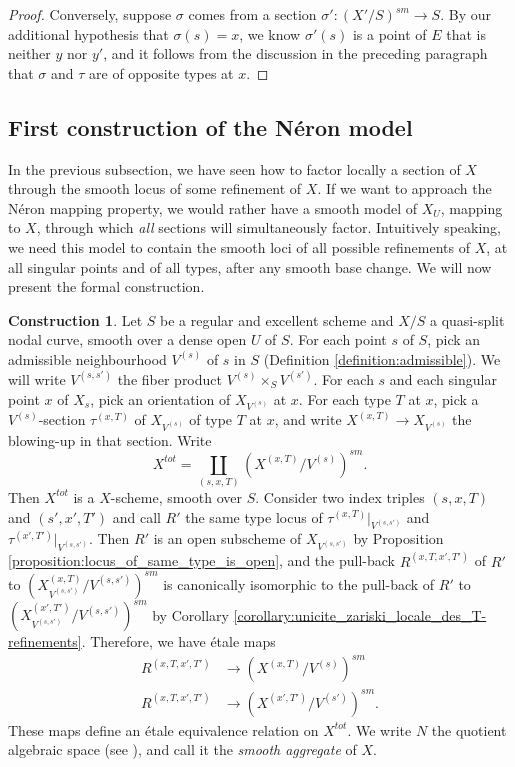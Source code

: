 \documentclass[a4paper,12pt]{amsart} %
\numberwithin{equation}{subsection}
\theoremstyle{definition}
\newtheorem{construction}[definition]{Construction}
\theoremstyle{plain}%
\theoremstyle{remark}
\begin{document}
\begin{proof}
		Conversely, suppose $\sigma$ comes from a section $\sigma'\colon (X'/S)^{sm}\to S$. By our additional hypothesis that $\sigma(s)=x$, we know $\sigma'(s)$ is a point of $E$ that is neither $y$ nor $y'$, and it follows from the discussion in the preceding paragraph that $\sigma$ and $\tau$ are of opposite types at $x$.
\end{proof}


\subsection{First construction of the N\'eron model}\label{section_nodal_agg}

In the previous subsection, we have seen how to factor locally a section of $X$ through the smooth locus of some refinement of $X$. If we want to approach the N\'eron mapping property, we would rather have a smooth model of $X_U$, mapping to $X$, through which \emph{all} sections will simultaneously factor. Intuitively speaking, we need this model to contain the smooth loci of all possible refinements of $X$, at all singular points and of all types, after any smooth base change. We will now present the formal construction.

\begin{construction}\label{construction:nodal_aggregate}
Let $S$ be a regular and excellent scheme and $X/S$ a quasi-split nodal curve, smooth over a dense open $U$ of $S$. For each point $s$ of $S$, pick an admissible neighbourhood $V^{(s)}$ of $s$ in $S$ (Definition \ref{definition:admissible}). We will write $V^{(s,s')}$ the fiber product $V^{(s)}\times_S V^{(s')}$. For each $s$ and each singular point $x$ of $X_s$, pick an orientation of $X_{V^{(s)}}$ at $x$. For each type $T$ at $x$, pick a $V^{(s)}$-section $\tau^{(x,T)}$ of $X_{V^{(s)}}$ of type $T$ at $x$, and write $X^{(x,T)}\to X_{V^{(s)}}$ the blowing-up in that section. Write
\[
X^{tot}=\coprod\limits_{(s,x,T)} (X^{(x,T)}/V^{(s)})^{sm}.
\]
Then $X^{tot}$ is a $X$-scheme, smooth over $S$. Consider two index triples $(s,x,T)$ and $(s',x',T')$ and call $R'$ the same type locus of $\tau^{(x,T)}|_{V^{(s,s')}}$ and $\tau^{(x',T')}|_{V^{(s,s')}}$. Then $R'$ is an open subscheme of $X_{V^{(s,s')}}$ by Proposition \ref{proposition:locus_of_same_type_is_open}, and the pull-back $R^{(x,T,x',T')}$ of $R'$ to $(X^{(x,T)}_{V^{(s,s')}}/V^{(s,s')})^{sm}$ is canonically isomorphic to the pull-back of $R'$ to $(X^{(x',T')}_{V^{(s,s')}}/V^{(s,s')})^{sm}$ by Corollary \ref{corollary:unicite_zariski_locale_des_T-refinements}. Therefore, we have \'etale maps
\begin{align*}
R^{(x,T,x',T')}&\to (X^{(x,T)}/V^{(s)})^{sm}\\
R^{(x,T,x',T')}&\to (X^{(x',T')}/V^{(s')})^{sm}.
\end{align*}
These maps define an \'etale equivalence relation on $X^{tot}$. We write $N$ the quotient algebraic space (see \cite[\href{https://stacks.math.columbia.edu/tag/02WW}{Tag 02WW}]{stacks-project}), and call it the \emph{smooth aggregate} of $X$.
\end{construction}
\end{document}
